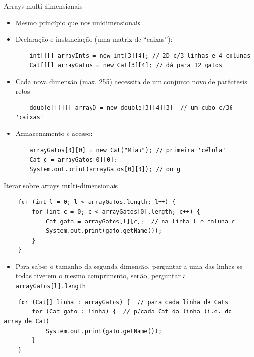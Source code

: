\documentclass[portuguese, aspectratio=169, xcolor=table]{beamer}
\begin{document}
\begin{frame}[fragile]{Arrays multi-dimensionais}
\begin{itemize}
    \item Mesmo princípio que nos unidimensionais
    \item Declaração e instanciação (uma matriz de ``caixas''):
    \begin{verbatim}
    int[][] arrayInts = new int[3][4]; // 2D c/3 linhas e 4 colunas
    Cat[][] arrayGatos = new Cat[3][4]; // dá para 12 gatos
    \end{verbatim}
\item Cada nova dimensão (max. 255) necessita de um conjunto novo de parêntesis retos
\begin{verbatim}
    double[][][] arrayD = new double[3][4][3]  // um cubo c/36 'caixas'
\end{verbatim}
\item Armazenamento e acesso:
\begin{verbatim}
    arrayGatos[0][0] = new Cat("Miau"); // primeira 'célula'
    Cat g = arrayGatos[0][0];
    System.out.print(arrayGatos[0][0]); // ou g
\end{verbatim}
\end{itemize}
\end{frame}

\begin{frame}[fragile]{Iterar sobre arrays multi-dimensionais}
\begin{verbatim}
    for (int l = 0; l < arrayGatos.length; l++) {
        for (int c = 0; c < arrayGatos[0].length; c++) {
            Cat gato = arrayGatos[l][c];  // na linha l e coluna c
            System.out.print(gato.getName());
        }
    }
\end{verbatim}
\begin{itemize}
    \item Para saber o tamanho da segunda dimensão, perguntar a uma das linhas se todas tiverem o mesmo comprimento, senão, perguntar a \texttt{arrayGatos[l].length}
\end{itemize}
\begin{verbatim}
    for (Cat[] linha : arrayGatos) {  // para cada linha de Cats
        for (Cat gato : linha) {  // p/cada Cat da linha (i.e. do array de Cat)
            System.out.print(gato.getName());
        }
    }
\end{verbatim}
\end{frame}
\end{document}
